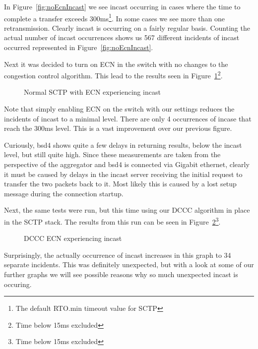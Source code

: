 \documentclass[12pt]{article}
\begin{document}
In Figure~\ref{fig:noEcnIncast} we see incast occurring in cases where the time to complete a transfer exceeds
300ms\footnote{The default RTO.min timeout value for SCTP}. In some cases we see more than
one retransmission. Clearly incast is occurring on a fairly regular basis. Counting the actual number
of incast occurrences shows us 567 different incidents of incast occurred represented in Figure~\ref{fig:noEcnIncast}.

\newpage

Next it was decided to turn on ECN in the switch with no changes to the congestion control algorithm. This
lead to the results seen in Figure~\ref{fig:ecnIncast}\footnote{Time below 15ms excluded}.

\begin{figure}[h]
\centering
{}
\caption{Normal SCTP with ECN experiencing incast}
\label{fig:ecnIncast}
\end{figure}


Note that simply enabling ECN on the switch with our settings reduces the incidents of incast to a minimal
level. There are only 4 occurrences of incase that reach the 300ms level. This is a vast improvement over
our previous figure.  

Curiously,  bsd4 shows quite a few delays in returning results, below the incast level, 
but still quite high. Since these measurements are taken from the perspective of the aggregator and
bsd4 is connected via Gigabit ethernet, clearly it must be caused by delays in the incast server
receiving the initial request to transfer the two packets back to it. Most likely this is caused by
a lost setup message during the connection startup.

\newpage

Next, the same tests were run, but this time using our DCCC algorithm in place in the SCTP stack. The
results from this run can be seen in Figure~\ref{fig:dcccIncast}\footnote{Time below 15ms excluded}.

\begin{figure}[h]
\centering
{}
\caption{DCCC ECN experiencing incast}
\label{fig:dcccIncast}
\end{figure}


Surprisingly, the actually occurrence of incast increases in this graph to 34 separate incidents. This
was definitely unexpected, but with a look at some of our further graphs we will see possible
reasons why so much unexpected incast is occuring.
\end{document}
